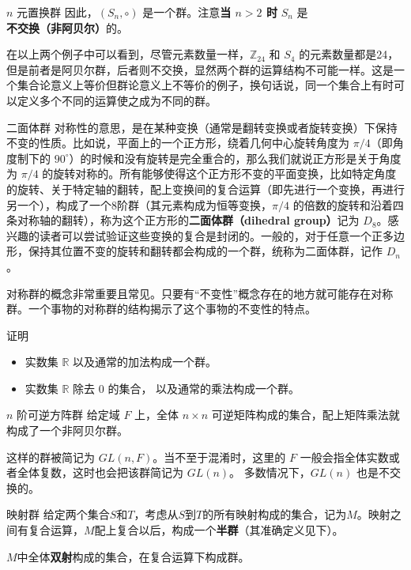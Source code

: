 \begin{example}{$n$ 元置换群}
因此，$(S_n, \circ)$ 是一个群。注意\textbf{当 $n>2$ 时} $S_n$ 是\textbf{不交换（非阿贝尔）}的。
\end{example}

在以上两个例子中可以看到，尽管元素数量一样，$\mathbb{Z}_{24}$ 和 $S_4$ 的元素数量都是24，但是前者是阿贝尔群，后者则不交换，显然两个群的运算结构不可能一样。这是一个集合论意义上等价但群论意义上不等价的例子，换句话说，同一个集合上有时可以定义多个不同的运算使之成为不同的群。

\begin{example}{二面体群}\label{Group_ex4}
对称性的意思，是在某种变换（通常是翻转变换或者旋转变换）下保持不变的性质。比如说，平面上的一个正方形，绕着几何中心旋转角度为 $\pi/4$（即角度制下的 $90^\circ$）的时候和没有旋转是完全重合的，那么我们就说正方形是关于角度为 $\pi/4$ 的旋转对称的。所有能够使得这个正方形不变的平面变换，比如特定角度的旋转、关于特定轴的翻转，配上变换间的复合运算（即先进行一个变换，再进行另一个），构成了一个8阶群（其元素构成为恒等变换，$\pi/4$ 的倍数的旋转和沿着四条对称轴的翻转），称为这个正方形的\textbf{二面体群（dihedral group）}记为 $D_8$。感兴趣的读者可以尝试验证这些变换的复合是封闭的。一般的，对于任意一个正多边形，保持其位置不变的旋转和翻转都会构成的一个群，统称为二面体群，记作 $D_n$。
\end{example}
对称群的概念非常重要且常见。只要有“不变性”概念存在的地方就可能存在对称群。一个事物的对称群的结构揭示了这个事物的不变性的特点。

\begin{exercise}{}
证明
\begin{itemize}
\item 实数集 $\mathbb R$ 以及通常的加法构成一个群。
\item 实数集 $\mathbb R$ 除去 $0$ 的集合， 以及通常的乘法构成一个群。
\end{itemize}
\end{exercise}

\begin{example}{$n$ 阶可逆方阵群}\label{Group_ex5}
给定域 $F$ 上，全体 $n\times n$ 可逆矩阵构成的集合，配上矩阵乘法就构成了一个非阿贝尔群。%

这样的群被简记为 $GL(n, F)$。当不至于混淆时，这里的 $F$ 一般会指全体实数或者全体复数，这时也会把该群简记为 $GL(n)$。 多数情况下，$GL(n)$ 也是不交换的。
\end{example}


\begin{example}{映射群}\label{Group_ex6}
给定两个集合$S$和$T$，考虑从$S$到$T$的所有映射构成的集合，记为$M$。映射之间有复合运算，$M$配上复合以后，构成一个\textbf{半群}（其准确定义见下）。

$M$中全体\textbf{双射}构成的集合，在复合运算下构成群。
\end{example}

